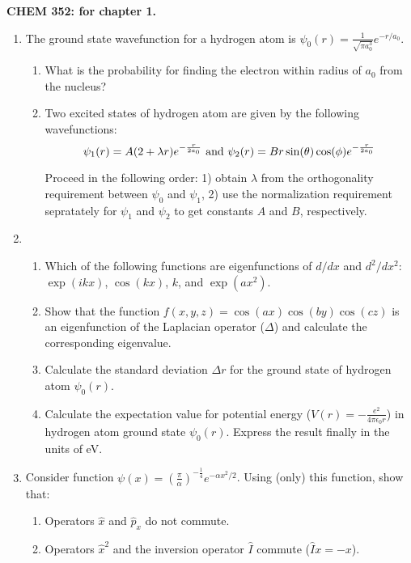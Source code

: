 \noindent
\textbf{CHEM 352:
 for chapter 1.}\\

\begin{enumerate}
\item The ground state wavefunction for a hydrogen atom is $\psi_0(r) = \frac{1}{\sqrt{\pi a_0^3}}e^{-r/a_0}$.
\begin{enumerate}
\item What is the probability for finding the electron within radius of $a_0$ from the nucleus?
\item Two excited states of hydrogen atom are given by the following wavefunctions:
$$\psi_1(r) = A(2 + \lambda r)e^{-\frac{r}{2a_0}}\textnormal{ and }\psi_2(r) = Br\sin(\theta)\cos(\phi)e^{-\frac{r}{2a_0}}$$

Proceed in the following order: 1) obtain $\lambda$ from the orthogonality requirement between $\psi_0$ and $\psi_1$, 2) use the normalization requirement sepratately for $\psi_1$ and $\psi_2$ to get constants $A$ and $B$, respectively.
\end{enumerate}


\item 
\begin{enumerate}
\item Which of the following functions are eigenfunctions of $d/dx$ and $d^2/dx^2$: $\exp(ikx)$, $\cos(kx)$, $k$, and $\exp(ax^2)$.
\item Show that the function $f(x, y, z) = \cos(ax)\cos(by)\cos(cz)$ is an eigenfunction of the Laplacian operator ($\Delta$) and calculate the corresponding eigenvalue.
\item Calculate the standard deviation $\Delta r$ for the ground state of hydrogen atom $\psi_0(r)$.
\item Calculate the expectation value for potential energy ($V(r) = -\frac{e^2}{4\pi\epsilon_0r}$) in hydrogen atom ground state $\psi_0(r)$. Express the result finally in the units of eV.
\end{enumerate}


\item Consider function $\psi(x) = \left(\frac{\pi}{\alpha}\right)^{-\frac{1}{4}}e^{-\alpha x^2/2}$. Using (only) this function, show that:

\begin{enumerate}
\item Operators $\hat{x}$ and $\hat{p}_x$ do not commute.
\item Operators $\hat{x}^2$ and the inversion operator $\hat{I}$ commute ($\hat{I}x = -x$).
\end{enumerate}


\end{enumerate}
